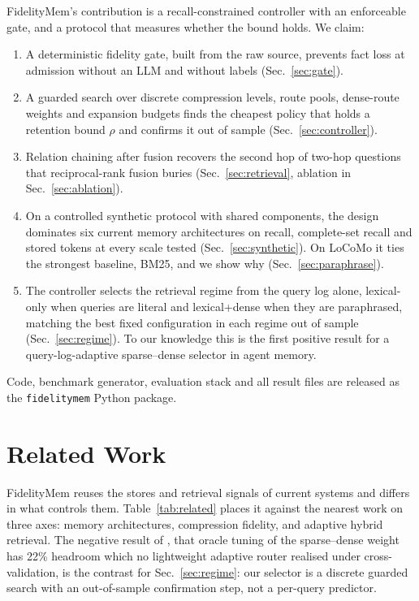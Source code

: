\documentclass[conference]{IEEEtran}
\begin{document}
FidelityMem's contribution is a recall-constrained controller with an enforceable gate, and a protocol that measures whether the bound holds. We claim:
\begin{enumerate}
\item A deterministic fidelity gate, built from the raw source, prevents fact loss at admission without an LLM and without labels (Sec.~\ref{sec:gate}).
\item A guarded search over discrete compression levels, route pools, dense-route weights and expansion budgets finds the cheapest policy that holds a retention bound $\rho$ and confirms it out of sample (Sec.~\ref{sec:controller}).
\item Relation chaining after fusion recovers the second hop of two-hop questions that reciprocal-rank fusion buries (Sec.~\ref{sec:retrieval}, ablation in Sec.~\ref{sec:ablation}).
\item On a controlled synthetic protocol with shared components, the design dominates six current memory architectures on recall, complete-set recall and stored tokens at every scale tested (Sec.~\ref{sec:synthetic}). On LoCoMo it ties the strongest baseline, BM25, and we show why (Sec.~\ref{sec:paraphrase}).
\item The controller selects the retrieval regime from the query log alone, lexical-only when queries are literal and lexical+dense when they are paraphrased, matching the best fixed configuration in each regime out of sample (Sec.~\ref{sec:regime}). To our knowledge this is the first positive result for a query-log-adaptive sparse--dense selector in agent memory.
\end{enumerate}
Code, benchmark generator, evaluation stack and all result files are released as the \texttt{fidelitymem} Python package.

\section{Related Work}
FidelityMem reuses the stores and retrieval signals of current systems and differs in what controls them. Table~\ref{tab:related} places it against the nearest work on three axes: memory architectures, compression fidelity, and adaptive hybrid retrieval. The negative result of \cite{fairness}, that oracle tuning of the sparse--dense weight has 22\% headroom which no lightweight adaptive router realised under cross-validation, is the contrast for Sec.~\ref{sec:regime}: our selector is a discrete guarded search with an out-of-sample confirmation step, not a per-query predictor.
\end{document}
